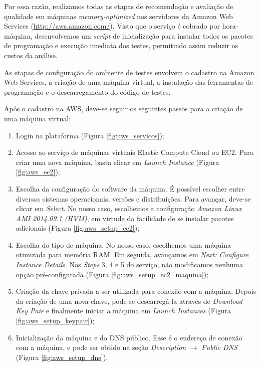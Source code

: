 Por essa razão, realizamos todas as etapas de recomendação e avaliação de qualidade em máquinas \textit{memory-optimized} nos servidores da Amazon Web Services (\url{http://aws.amazon.com/}). Visto que o serviço é cobrado por hora-máquina, desenvolvemos um \textit{script} de inicialização para instalar todos os pacotes de programação e execução imediata dos testes, permitindo assim reduzir os custos da análise.   

As etapas de configuração do ambiente de testes envolvem o cadastro na Amazon Web Services, a criação de uma máquina virtual, a instalação das ferramentas de programação e o descarregamento do código de testes.

Após o cadastro na AWS, deve-se seguir os seguintes passos para a criação de uma máquina virtual:

\begin{enumerate}
\item Login na plataforma (Figura \ref{fig:aws_servicos});
\item Acesso ao serviço de máquinas virtuais Elastic Compute Cloud ou EC2. Para criar uma nova máquina, basta clicar em \textit{Launch Instance} (Figura \ref{fig:aws_ec2});
\item Escolha da configuração do software da máquina. É possível escolher entre diversos sistemas operacionais, versões e distribuições. Para avançar, deve-se clicar em \textit{Select}. No nosso caso, escolhemos a configuração \textit{Amazon Linux AMI 2014.09.1 (HVM)}, em virtude da facilidade de se instalar pacotes adicionais  (Figura \ref{fig:aws_setup_ec2});
\item Escolha do tipo de máquina. No nosso caso, escolhemos uma máquina otimizada para memória RAM. Em seguida, avançamos em \textit{Next: Configure Instance Details}. Nos \textit{Steps} 3, 4 e 5 do serviço, não modificamos nenhuma opção pré-configurada (Figura \ref{fig:aws_setup_ec2_maquina});
\item Criação da chave privada a ser utilizada para conexão com a máquina. Depois da criação de uma nova chave, pode-se descarregá-la através de \textit{Download Key Pair} e finalmente iniciar a máquina em \textit{Launch Instances} (Figura \ref{fig:aws_setup_keypair});
\item Inicialização da máquina e do DNS público. Esse é o endereço de conexão com a máquina, e pode ser obtido na seção \textit{Description} $\rightarrow$ \textit{Public DNS} (Figura \ref{fig:aws_setup_dns}).
\end{enumerate}

